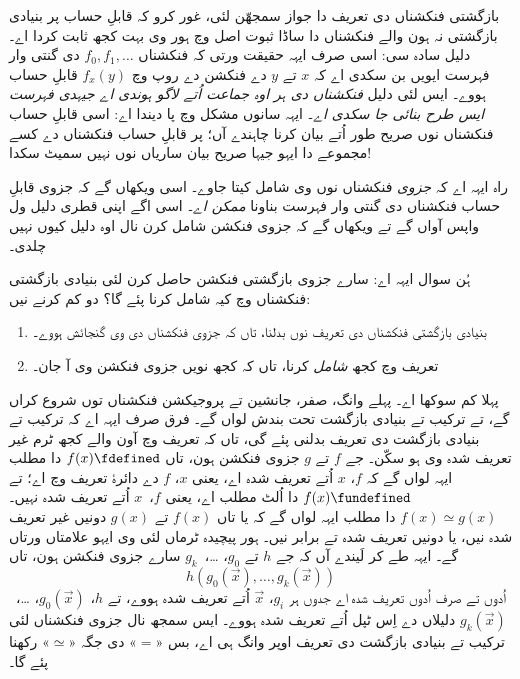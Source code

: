 \documentclass[../../../include/open-logic-section]{subfiles}
\begin{document}

بازگشتی فنکشناں دی تعریف دا جواز سمجھّن لئی، غور
کرو کہ قابلِ حساب پر بنیادی بازگشتی نہ ہون والے
فنکشناں دا ساڈا ثبوت اصل وچ ہور وی بہت کجھ ثابت
کردا اے۔ دلیل سادہ سی: اسی صرف ایہہ حقیقت ورتی
کہ فنکشناں $f_0,f_1,\dots$ دی گنتی وار فہرست
ایویں بن سکدی اے کہ $x$ تے $y$ دے فنکشن دے
روپ وچ $f_x(y)$ قابلِ حساب ہووے۔ ایس لئی دلیل
\emph{فنکشناں دی ہر اوہ جماعت اُتے لاگو ہوندی اے
جیہدی فہرست ایس طرح بنائی جا سکدی اے}۔ ایہہ
سانوں مشکل وچ پا دیندا اے: اسی قابلِ حساب فنکشناں
نوں صریح طور اُتے بیان کرنا چاہندے آں؛ پر قابلِ
حساب فنکشناں دے کسے مجموعے دا ایہو جیہا صریح
بیان ساریاں نوں نہیں سمیٹ سکدا!

راہ ایہہ اے کہ \emph{جزوی} فنکشناں نوں وی شامل
کیتا جاوے۔ اسی ویکھاں گے کہ جزوی قابلِ حساب
فنکشناں دی گنتی وار فہرست بناونا \emph{ممکن اے}۔
 اسی اگے
اپنی قطری دلیل ول واپس آواں گے تے ویکھاں گے کہ
جزوی فنکشن شامل کرن نال اوہ دلیل کیوں نہیں چلدی۔

ہُن سوال ایہہ اے: سارے جزوی بازگشتی فنکشن حاصل
کرن لئی بنیادی بازگشتی فنکشناں وچ کیہ شامل کرنا
پئے گا؟ دو کم کرنے نیں:
\begin{enumerate}
\item بنیادی بازگشتی فنکشناں دی تعریف نوں بدلنا،
تاں کہ جزوی فنکشناں دی وی گنجائش ہووے۔
\item تعریف وچ کجھ \emph{شامل} کرنا، تاں کہ
کجھ نویں جزوی فنکشن وی آ جان۔
\end{enumerate}

پہلا کم سوکھا اے۔ پہلے وانگ، صفر، جانشین تے
پروجیکشن فنکشناں توں شروع کراں گے، تے ترکیب تے
بنیادی بازگشت تحت بندش لواں گے۔ فرق صرف ایہہ
اے کہ ترکیب تے بنیادی بازگشت دی تعریف بدلنی
پئے گی، تاں کہ تعریف وچ آون والے کجھ ٹرم غیر
تعریف شدہ وی ہو سکّن۔ جے $f$ تے $g$ جزوی
فنکشن ہون، تاں $f(x) \fdefined$ دا مطلب ایہہ
لواں گے کہ $f$، $x$ اُتے تعریف شدہ اے، یعنی
$x$، $f$ دے دائرۂ تعریف وچ اے؛ تے $f(x)
\fundefined$ دا اُلٹ مطلب اے، یعنی $f$،~$x$
اُتے تعریف شدہ نہیں۔ $f(x) \simeq g(x)$ دا
مطلب ایہہ لواں گے کہ یا تاں $f(x)$ تے $g(x)$
دونیں غیر تعریف شدہ نیں، یا دونیں تعریف شدہ تے
برابر نیں۔ ہور پیچیدہ ٹرماں لئی وی ایہو علامتاں
ورتاں گے۔ ایہہ طے کر لَیندے آں کہ جے
$h$ تے $g_0$، \dots،~$g_k$ سارے جزوی
فنکشن ہون، تاں
\[
h(g_0(\vec x),\dots,g_k(\vec x))
\]
اُدوں تے صرف اُدوں تعریف شدہ اے جدوں ہر $g_i$،
$\vec x$ اُتے تعریف شدہ ہووے، تے $h$،
$g_0(\vec x)$، \dots،~$g_k(\vec x)$ دلیلاں
دے اِس ٹپل اُتے تعریف شدہ ہووے۔ ایس سمجھ نال جزوی فنکشناں لئی
ترکیب تے بنیادی بازگشت دی تعریف اوپر وانگ ہی اے،
بس «$=$» دی جگہ «$\simeq$» رکھنا پئے گا۔
\end{document}
